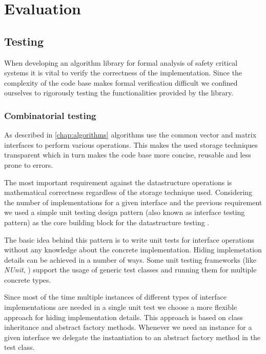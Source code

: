 \chapter{Evaluation}
\label{chap:evaluation}

\section{Testing}

When developing an algorithm library for formal analysis of safety critical systems it is vital to verify the correctness of the implementation. Since the complexity of the code base makes formal verification difficult we confined ourselves to rigorously testing the functionalities provided by the library.

\subsection{Combinatorial testing}

As described in \cref{chap:algorithms} algorithms use the common vector and matrix interfaces to perform various operations. This makes the used storage techniques transparent which in turn makes the code base more concise, reusable and less prone to errors. 

The most important requirement against the datastructure operations is mathematical correctness regardless of the storage technique used. Considering the number of implementations for a given interface and the previous requirement we used a simple unit testing design pattern (also known as interface testing pattern) as the core building block for the datastructure testing \citep{myers2011art}. 

The basic idea behind this pattern is to write unit tests for interface operations without any knowledge about the concrete implementation. Hiding implemetation details can be achieved in a number of ways. Some unit testing frameworks (like \emph{NUnit}, \citep{NUnit}) support the usage of generic test classes and running them for multiple concrete types.

Since most of the time multiple instances of different types of interface implementations are needed in a single unit test we choose a more flexible approach for hiding implementation details. This approach is based on class inheritance and abstract factory methods. Whenever we need an instance for a given interface we delegate the instantiation to an abstract factory method in the test class. 

